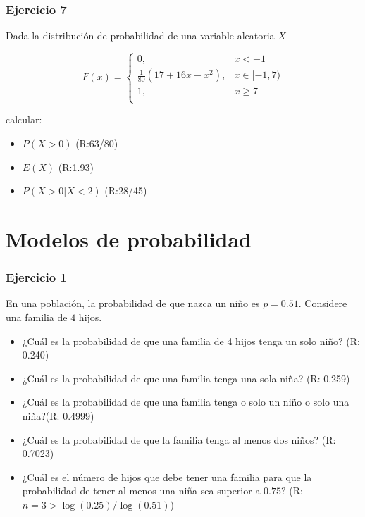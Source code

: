 \documentclass[
]{book}
\providecommand{\tightlist}{%
  \setlength{\itemsep}{0pt}\setlength{\parskip}{0pt}}
\begin{document}
\hypertarget{ejercicio-7}{%
\subsubsection{Ejercicio 7}\label{ejercicio-7}}

Dada la distribución de probabilidad de una variable aleatoria \(X\)

\[
    F(x)= 
\begin{cases}
0, & x  < -1 \\
\frac{1}{80}(17+16x-x^2),& x \in [-1,7)\\
1,& x \geq 7\\
\end{cases}
\]

calcular:

\begin{itemize}
\tightlist
\item
  \(P(X>0)\) (R:63/80)
\item
  \(E(X)\) (R:1.93)
\item
  \(P(X>0|X<2)\) (R:28/45)
\end{itemize}

\hypertarget{modelos-de-probabilidad}{%
\section{Modelos de probabilidad}\label{modelos-de-probabilidad}}

\hypertarget{ejercicio-1-4}{%
\subsubsection{Ejercicio 1}\label{ejercicio-1-4}}

En una población, la probabilidad de que nazca un niño es \(p=0.51\). Considere una familia de \(4\) hijos.

\begin{itemize}
\tightlist
\item
  ¿Cuál es la probabilidad de que una familia de 4 hijos tenga un solo niño? (R: 0.240)
\item
  ¿Cuál es la probabilidad de que una familia tenga una sola niña? (R: 0.259)
\item
  ¿Cuál es la probabilidad de que una familia tenga o solo un niño o solo una niña?(R: 0.4999)
\item
  ¿Cuál es la probabilidad de que la familia tenga al menos dos niños? (R: 0.7023)
\item
  ¿Cuál es el número de hijos que debe tener una familia para que la probabilidad de tener al menos una niña sea superior a \(0.75\)? (R:\(n=3>\log(0.25)/\log(0.51)\))
\end{itemize}
\end{document}
